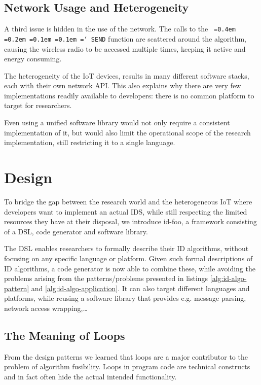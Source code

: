 \documentclass[conference]{IEEEtran}
\newcommand{\NAME}{id-foo\xspace}
\newcommand*\justify{%
  \fontdimen2\font=0.4em%
  \fontdimen3\font=0.2em%
  \fontdimen4\font=0.1em%
  \fontdimen7\font=0.1em%
  \hyphenchar\font=`\-%
}
\newcommand{\ttt}[1]{\texttt{\justify{#1}}}
\begin{document}
\subsection*{Network Usage and Heterogeneity}

A third issue is hidden in the use of the network. The calls to the \ttt{SEND}
function are scattered around the algorithm, causing the wireless radio to be
accessed multiple times, keeping it active and energy consuming.

The heterogeneity of the IoT devices, results in many different software
stacks, each with their own network API. This also explains why there are very
few implementations readily available to developers: there is no common
platform to target for researchers.

Even using a unified software library would not only require a consistent
implementation of it, but would also limit the operational scope of the
research implementation, still restricting it to a single language.

\section{Design}
\label{design}

To bridge the gap between the research world and the heterogeneous IoT where
developers want to implement an actual IDS, while still respecting the limited
resources they have at their disposal, we introduce \NAME, a framework
consisting of a DSL, code generator and software library.

The DSL enables researchers to formally describe their ID algorithms, without
focusing on any specific language or platform. Given such formal descriptions
of ID algorithms, a code generator is now able to combine these, while avoiding
the problems arising from the patterns/problems presented in listings
\ref{alg:id-algo-pattern} and \ref{alg:id-algo-application}. It can also target
different languages and platforms, while reusing a software library that
provides e.g. message parsing, network access wrapping,\dots

\subsection*{The Meaning of Loops}

From the design patterns we learned that loops are a major contributor to the
problem of algorithm fusibility. Loops in program code are technical constructs
and in fact often hide the actual intended functionality.
\end{document}
